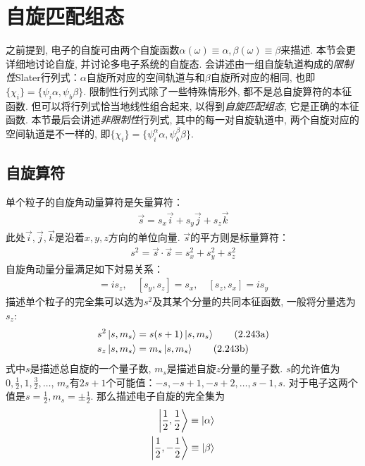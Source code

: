 \section{自旋匹配组态}
\label{sec2.5}
之前提到, 电子的自旋可由两个自旋函数$\alpha(\omega) \equiv \alpha, \beta(\omega) \equiv \beta$来描述. 本节会更详细地讨论自旋, 并讨论多电子系统的自旋态. 会讲述由一组自旋轨道构成的\emph{限制性}Slater行列式：$\alpha$自旋所对应的空间轨道与和$\beta$自旋所对应的相同, 也即$\{\chi_i\} = \{\psi_i\alpha,\psi_b\beta\}$. 限制性行列式除了一些特殊情形外, 都不是总自旋算符的本征函数. 但可以将行列式恰当地线性组合起来, 以得到\emph{自旋匹配组态}, 它是正确的本征函数. 本节最后会讲述\emph{非限制性}行列式, 其中的每一对自旋轨道中, 两个自旋对应的空间轨道是不一样的, 即$\{\chi_i\} = \{\psi_i^\alpha\alpha,\psi_b^\beta\beta\}$.
\subsection{自旋算符}
\label{sec2.5.1}
单个粒子的自旋角动量算符是矢量算符：
\begin{align}
\vec{s} = s_x\vec{i} + s_y\vec{j} + s_z\vec{k}
\end{align}
此处$\vec{i},\vec{j},\vec{k}$是沿着$x,y,z$方向的单位向量. $\vec{s}$的平方则是标量算符：
\begin{align}
s^2 = \vec{s}\cdot\vec{s} = s^2_x + s^2_y + s^2_z
\end{align}
自旋角动量分量满足如下対易关系：
\begin{align}
[s_x,s_y] = is_z,\quad [s_y,s_z] = s_x,\quad [s_z,s_x]=is_y
\end{align}
描述单个粒子的完全集可以选为$s^2$及其某个分量的共同本征函数, 一般将分量选为$s_z$:
\begin{subequations}
	\begin{align}
	s^2\Ket{s,m_s} & = s(s+1)\Ket{s,m_s}\tag{2.243a}\\
	s_z\Ket{s,m_s} & = m_s\Ket{s,m_s}\tag{2.243b}
	\end{align}
\end{subequations}
式中$s$是描述总自旋的一个量子数, $m_s$是描述自旋$z$分量的量子数. $s$的允许值为$0,\frac{1}{2},1,\frac{3}{2},\ldots$, $m_s$有$2s+1$个可能值：$-s,-s+1,-s+2,\ldots,s-1,s$. 对于电子这两个值是$s=\frac{1}{2},m_s=\pm\frac{1}{2}$. 那么描述电子自旋的完全集为
\begin{subequations}
	\begin{align}
	\Ket{\frac{1}{2},\frac{1}{2}} \equiv \Ket{\alpha}\\
	\Ket{\frac{1}{2},-\frac{1}{2}} \equiv \Ket{\beta}
	\end{align}
\end{subequations}
